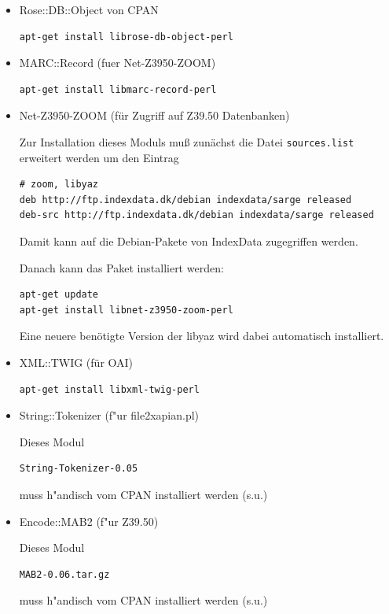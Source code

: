 \documentclass[11pt, twoside, a4paper, BCOR8mm, DIV12, bibtotoc,idxtotoc]{scrbook}
\begin{document}
\begin{itemize}
\item Rose::DB::Object von CPAN
\begin{verbatim}
apt-get install librose-db-object-perl
\end{verbatim}

\item MARC::Record (fuer Net-Z3950-ZOOM)
\begin{verbatim}
apt-get install libmarc-record-perl
\end{verbatim}

\item Net-Z3950-ZOOM (für Zugriff auf Z39.50 Datenbanken) 

Zur Installation dieses Moduls muß zunächst die Datei
  \texttt{sources.list} erweitert werden um den Eintrag
\begin{verbatim}
# zoom, libyaz
deb http://ftp.indexdata.dk/debian indexdata/sarge released
deb-src http://ftp.indexdata.dk/debian indexdata/sarge released
\end{verbatim}

Damit kann auf die Debian-Pakete von IndexData zugegriffen werden.

Danach kann das Paket installiert werden:
\begin{verbatim}
apt-get update
apt-get install libnet-z3950-zoom-perl
\end{verbatim}

Eine neuere benötigte Version der libyaz wird dabei automatisch
installiert.
\item XML::TWIG (für OAI)
\begin{verbatim}
apt-get install libxml-twig-perl
\end{verbatim}

\item String::Tokenizer (f"ur file2xapian.pl)

Dieses Modul 

\begin{verbatim}
String-Tokenizer-0.05
\end{verbatim}

muss h"andisch vom CPAN installiert werden (s.u.)

\item Encode::MAB2 (f"ur Z39.50)

Dieses Modul 

\begin{verbatim}
MAB2-0.06.tar.gz
\end{verbatim}

muss h"andisch vom CPAN installiert werden (s.u.)

\end{itemize}
\end{document}
